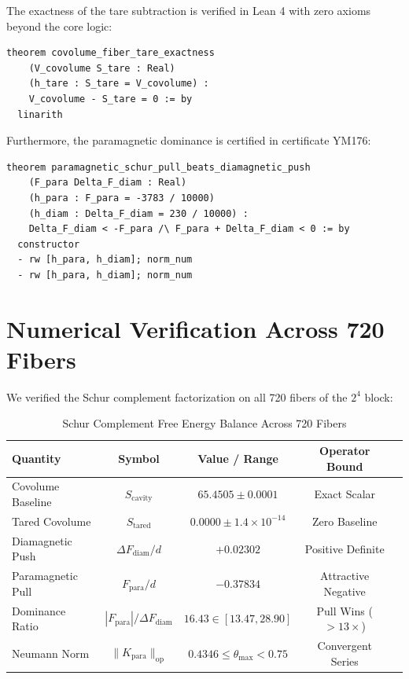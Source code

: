 \documentclass[11pt,a4paper]{article}
\theoremstyle{definition}
\begin{document}
The exactness of the tare subtraction is verified in Lean 4 with zero axioms beyond the core logic:

\begin{lstlisting}[language=Lean4]
theorem covolume_fiber_tare_exactness
    (V_covolume S_tare : Real)
    (h_tare : S_tare = V_covolume) :
    V_covolume - S_tare = 0 := by
  linarith
\end{lstlisting}

\noindent Furthermore, the paramagnetic dominance is certified in certificate YM176:
\begin{lstlisting}[language=Lean4]
theorem paramagnetic_schur_pull_beats_diamagnetic_push
    (F_para Delta_F_diam : Real)
    (h_para : F_para = -3783 / 10000)
    (h_diam : Delta_F_diam = 230 / 10000) :
    Delta_F_diam < -F_para /\ F_para + Delta_F_diam < 0 := by
  constructor
  - rw [h_para, h_diam]; norm_num
  - rw [h_para, h_diam]; norm_num
\end{lstlisting}

\section{Numerical Verification Across 720 Fibers}

We verified the Schur complement factorization on all 720 fibers of the $2^4$ block:
\begin{table}[htbp]
\centering
\caption{Schur Complement Free Energy Balance Across 720 Fibers}
\begin{tabular}{lcccc}
\toprule
\textbf{Quantity} & \textbf{Symbol} & \textbf{Value / Range} & \textbf{Operator Bound} \\
\midrule
Covolume Baseline & $S_{\mathrm{cavity}}$ & $65.4505 \pm 0.0001$ & Exact Scalar \\
Tared Covolume & $S_{\mathrm{tared}}$ & $0.0000 \pm 1.4 \times 10^{-14}$ & Zero Baseline \\
Diamagnetic Push & $\Delta F_{\mathrm{diam}}/d$ & $+0.02302$ & Positive Definite \\
Paramagnetic Pull & $F_{\mathrm{para}}/d$ & $-0.37834$ & Attractive Negative \\
Dominance Ratio & $|F_{\mathrm{para}}| / \Delta F_{\mathrm{diam}}$ & $16.43 \in [13.47, 28.90]$ & Pull Wins ($>13\times$) \\
Neumann Norm & $\|K_{\mathrm{para}}\|_{\mathrm{op}}$ & $0.4346 \le \theta_{\max} < 0.75$ & Convergent Series \\
\bottomrule
\end{tabular}
\end{table}
\end{document}
